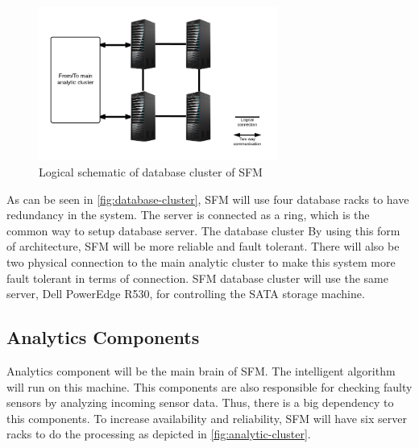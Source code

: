 \begin{figure}[hb!]
\centering
\includegraphics[width=0.7\textwidth]{6-hardware/images/db-cluster.png}
\caption{Logical schematic of database cluster of SFM}
\label{fig:database-cluster}
\end{figure}

As can be seen in \autoref{fig:database-cluster}, SFM will use four database racks to have redundancy in the system. The server is connected as a ring, which is the common way to setup database server. The database cluster By using this form of architecture, SFM will be more reliable and fault tolerant. There will also be two physical connection to the main analytic cluster to make this system more fault tolerant in terms of connection. SFM database cluster will use the same server, Dell PowerEdge R530, for controlling the SATA storage machine.





\subsection{Analytics Components}
\label{subsec:analytics}
Analytics component will be the main brain of SFM. The intelligent algorithm will run on this machine. This components are also responsible for checking faulty sensors by analyzing incoming sensor data. Thus, there is a big dependency to this components. To increase availability and reliability, SFM will have six server racks to do the processing as depicted in \autoref{fig:analytic-cluster}.

